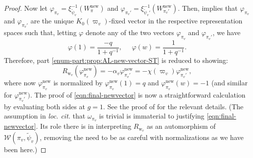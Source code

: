 \documentclass[10pt, twoside]{amsart}
\theoremstyle{plain}
\theoremstyle{definition}
\theoremstyle{remark}
\numberwithin{equation}{subsection}
\def\new{\mathrm{new}}
\def\calw{\mathcal W}
\begin{document}
\begin{proof}
Now let $\varphi_{\pi_v} = \xi_{\widetilde \psi_v}^{-1}(W_{\pi}^{\new})$ and $\varphi_{\pi_v'} = \xi_{\widetilde \psi_v'}^{-1}(W_{\pi_v'}^{\new})$. Then, \cite[Eq.\ (37)]{Schmidt} implies that $\varphi_{\pi_v}$ and $\varphi_{\pi_v'}$ are the unique $K_0(\varpi_v)$-fixed vector in the respective representation spaces
such that, letting $\varphi$ denote any of the two vectors $\varphi_{\pi_v}$ and $\varphi_{\pi_v'}$, 
we have 
\begin{equation*}
\varphi(1) = \frac{-q}{1+q^{-1}}, \;\;\;\;\; \varphi(w) = \frac{1}{1+q^{-1}}.
\end{equation*}
Therefore, part \ref{enum-part:prop:AL-new-vector-ST} is reduced to showing:
\begin{equation}\label{eqn:final-newvector}
R_{{ \boldsymbol{\mathrm{w}}}_v}(\varphi_{\pi_v}^{\new}) = -\alpha_v \varphi_{\pi_v'}^{\new} = -\chi(\varpi_v)\varphi_{\pi_v'}^{\new},
\end{equation}
where now $\varphi_{\pi_v}^{\new}$ is normalized by $\varphi_{\pi_v}^{\new}(1) = q$ and $\varphi_{\pi_v}^{\new}(w) = -1$ (and similar for $\varphi_{\pi_v'}^{\new})$. The proof of  \eqref{eqn:final-newvector} is now a straightforward calculation by evaluating both sides at $g = 1$. See the proof of \cite[Proposition 3.1.2(i)]{Schmidt} for the relevant details. (The assumption in {\em loc. cit.} that $\omega_{\pi_v}$ is trivial is immaterial to justifying \eqref{eqn:final-newvector}. Its role there is in interpreting $R_{{ \boldsymbol{\mathrm{w}}}_v}$ as an automorphism of $\calw(\pi_v,\widetilde \psi_v)$, removing the need to be as careful with normalizations as we have been here.)


\end{proof}
\end{document}
